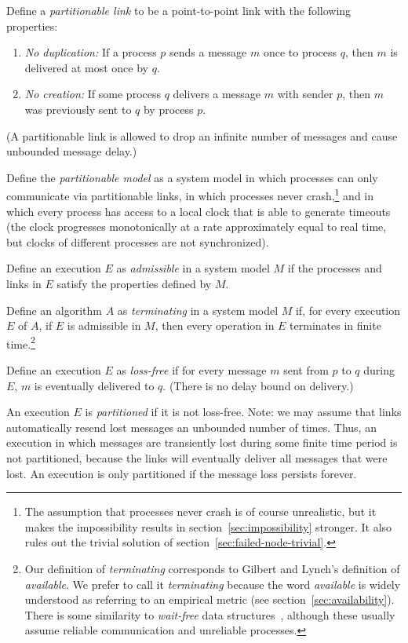 \documentclass[a4paper,twocolumn,10pt]{article}
\begin{document}
Define a \emph{partitionable link} to be a point-to-point link with the following properties:
\begin{enumerate}
    \item \emph{No duplication:} If a process $p$ sends a message $m$ once to process $q$, then $m$
        is delivered at most once by $q$.
    \item \emph{No creation:} If some process $q$ delivers a message $m$ with sender $p$, then $m$
        was previously sent to $q$ by process $p$.
\end{enumerate}
(A partitionable link is allowed to drop an infinite number of messages and cause unbounded message
delay.)

Define the \emph{partitionable model} as a system model in which processes can only communicate via
partitionable links, in which processes never crash,\footnote{The assumption that processes never
crash is of course unrealistic, but it makes the impossibility results in
section~\ref{sec:impossibility} stronger. It also rules out the trivial solution of
section~\ref{sec:failed-node-trivial}.} and in which every process has access to a local clock that
is able to generate timeouts (the clock progresses monotonically at a rate approximately equal to
real time, but clocks of different processes are not synchronized).

Define an execution $E$ as \emph{admissible} in a system model $M$ if the processes and links in $E$
satisfy the properties defined by $M$.

Define an algorithm $A$ as \emph{terminating} in a system model $M$ if, for every execution $E$ of
$A$, if $E$ is admissible in $M$, then every operation in $E$ terminates in finite
time.\footnote{Our definition of \emph{terminating} corresponds to Gilbert and Lynch's definition of
\emph{available}. We prefer to call it \emph{terminating} because the word \emph{available} is
widely understood as referring to an empirical metric (see section~\ref{sec:availability}). There is
some similarity to \emph{wait-free} data structures~\cite{Herlihy1988br}, although these usually
assume reliable communication and unreliable processes.}

Define an execution $E$ as \emph{loss-free} if for every message $m$ sent from $p$ to $q$ during
$E$, $m$ is eventually delivered to $q$. (There is no delay bound on delivery.)

An execution $E$ is \emph{partitioned} if it is not loss-free. Note: we may assume that links
automatically resend lost messages an unbounded number of times. Thus, an execution in which
messages are transiently lost during some finite time period is not partitioned, because the links
will eventually deliver all messages that were lost. An execution is only partitioned if the message
loss persists forever.
\end{document}

